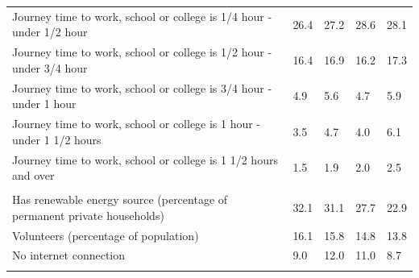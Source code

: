 \documentclass{article}
\begin{document}
\begin{table}[h]
\begin{tabular}{KTTTT}
Journey time to work, school or college is 1/4 hour - under 1/2 hour & 26.4& 27.2& 28.6& 28.1\\
Journey time to work, school or college is 1/2 hour - under 3/4 hour & 16.4& 16.9& 16.2& 17.3\\
Journey time to work, school or college is 3/4 hour - under 1 hour & 4.9& 5.6& 4.7& 5.9\\
Journey time to work, school or college is 1 hour - under 1 1/2 hours & 3.5& 4.7& 4.0& 6.1\\
Journey time to work, school or college is 1 1/2 hours and over & 1.5& 1.9& 2.0& 2.5\\
\hline
    \\ 
    \hline
Has renewable energy source (percentage of permanent private households) & 32.1& 31.1& 27.7& 22.9\\
    \hline
Volunteers (percentage of population) & 16.1& 15.8& 14.8& 13.8\\
    \hline
No internet connection&  9.0& 12.0& 11.0&  8.7\\
\hline
\end{tabular}
\end{table}
\end{document}
